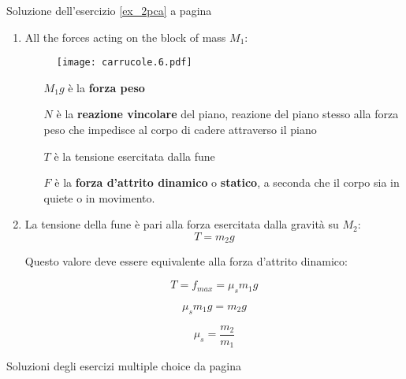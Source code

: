 
Soluzione dell'esercizio \ref{ex_2pca} a pagina \pageref{ex_2pca}\label{sol_2pca} \label{s_2pca}

\begin{enumerate}
\item All the forces acting on the block of mass $M_1$:

\begin{figure}[h]
\centering
\texttt{[image: carrucole.6.pdf]}
\end{figure}

\begin{itemize}
\item[$M_1g$] è la \textbf{forza peso} 
\item[$N$] è la \textbf{reazione vincolare} del piano, reazione del piano stesso alla forza peso che impedisce al corpo di cadere attraverso il piano
\item[$T$] è la tensione esercitata dalla fune
\item[$F$] è la \textbf{forza d’attrito dinamico} o \textbf{statico}, a seconda che il corpo sia in quiete o in movimento.
\end{itemize}

\item 
La tensione della fune è pari alla forza esercitata dalla gravità su $M_2$:
\begin{equation*}
T=m_2g
\end{equation*}

Questo valore deve essere equivalente alla forza d'attrito dinamico:

\begin{equation*}
T=f_{max}=\mu_sm_1g
\end{equation*}

\begin{equation*}
\mu_sm_1g=m_2g
\end{equation*}

\begin{equation*}
\mu_s=\frac{m_2}{m_1}
\end{equation*}

\end{enumerate}

Soluzioni degli esercizi multiple choice da pagina \pageref{q_mcmc} \label{s_mcmc}

